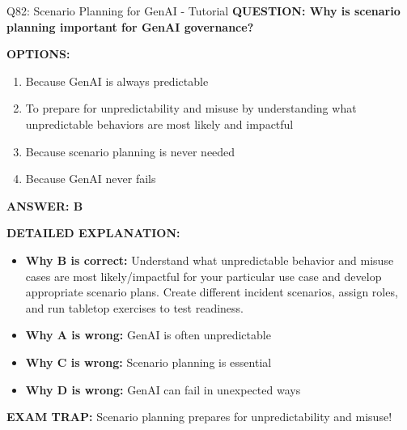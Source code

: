 \documentclass[8pt]{beamer}
\begin{document}
	\begin{frame}{Q82: Scenario Planning for GenAI - Tutorial}
		\fontsize{6.5}{7.5}\selectfont
		\textbf{QUESTION: Why is scenario planning important for GenAI governance?}
		
		\vspace{0.1cm}
		\textbf{OPTIONS:}
		\begin{enumerate}
			\item Because GenAI is always predictable
			\item To prepare for unpredictability and misuse by understanding what unpredictable behaviors are most likely and impactful
			\item Because scenario planning is never needed
			\item Because GenAI never fails
		\end{enumerate}
		
		\vspace{0.1cm}
		\textcolor{myblue}{\textbf{ANSWER: B}}
		
		\vspace{0.1cm}
		\textbf{DETAILED EXPLANATION:}
		\begin{itemize}
			\item \textbf{Why B is correct:} Understand what unpredictable behavior and misuse cases are most likely/impactful for your particular use case and develop appropriate scenario plans. Create different incident scenarios, assign roles, and run tabletop exercises to test readiness.
			\item \textbf{Why A is wrong:} GenAI is often unpredictable
			\item \textbf{Why C is wrong:} Scenario planning is essential
			\item \textbf{Why D is wrong:} GenAI can fail in unexpected ways
		\end{itemize}
		
		\textcolor{myred}{\textbf{EXAM TRAP:}} Scenario planning prepares for \textcolor{myblue}{unpredictability and misuse}!
	\end{frame}
	
\end{document}

